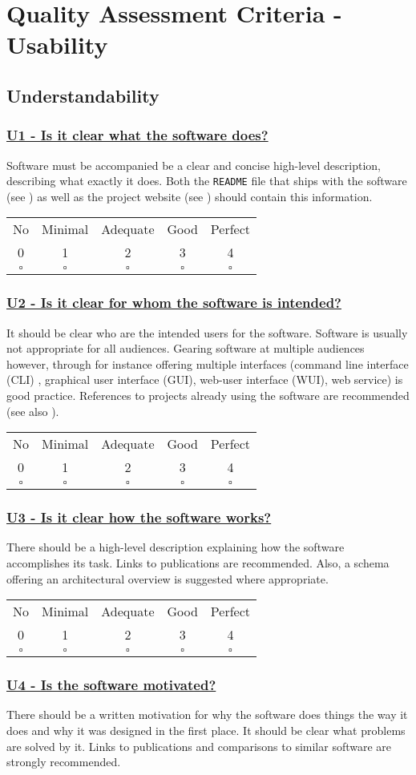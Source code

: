 \documentclass[a4paper,11pt]{article}
\newcommand{\criterion}[2]{\subsubsection*{\underline{#1 - #2}}\label{id:#1}}
\newcommand\CheckTable{%
  \begin{tabular}{ccccc}
    No & Minimal & Adequate & Good & Perfect \\
    0 & 1 & 2 & 3 & 4 \\
    \hline
    $\square$ & $\square$ & $\square$ & $\square$ & $\square$ \\
  \end{tabular}%
}
\newcommand{\refcrit}[1]{%
 \framebox[1.1\width]{\hyperref[id:#1]{#1}}
}
\begin{document}
\section{Quality Assessment Criteria - Usability}\label{sec:usab}


\subsection{Understandability}\label{sec:und}

\newcommand{\uOneID}{U1}
\newcommand{\uOneText}{Is it clear what the software does?}
\criterion{\uOneID}{\uOneText}

Software must be accompanied be a clear and concise high-level description,
describing what exactly it does. Both the \texttt{README} file that ships with
the software (see \refcrit{IS7}) as well as the project website (see
\refcrit{ID2}) should contain
this information. 

\CheckTable

\newcommand{\uTwoID}{U2}
\newcommand{\uTwoText}{Is it clear for whom the software is intended?}
\criterion{\uTwoID}{\uTwoText}

It should be clear who are the intended users for the software. Software is
usually not appropriate for all audiences. Gearing software at multiple
audiences however, through for instance offering multiple interfaces (command
line interface (CLI) , graphical user interface (GUI), web-user interface
(WUI), web service) is good practice. References to projects already using the
software are recommended (see also \refcrit{CM1}).

\CheckTable

\newcommand{\uThreeID}{U3}
\newcommand{\uThreeText}{Is it clear how the software works?}
\criterion{\uThreeID}{\uThreeText}

There should be a high-level description explaining how the software
accomplishes its task. Links to publications are recommended. Also, a schema
offering an architectural overview is suggested where appropriate. 

\CheckTable

\newcommand{\uFourID}{U4}
\newcommand{\uFourText}{Is the software motivated?}
\criterion{\uFourID}{\uFourText}

There should be a written motivation for why the software does things the way
it does and why it was designed in the first place. It should be clear what
problems are solved by it. Links to publications and comparisons to similar
software are strongly recommended.
\end{document}
